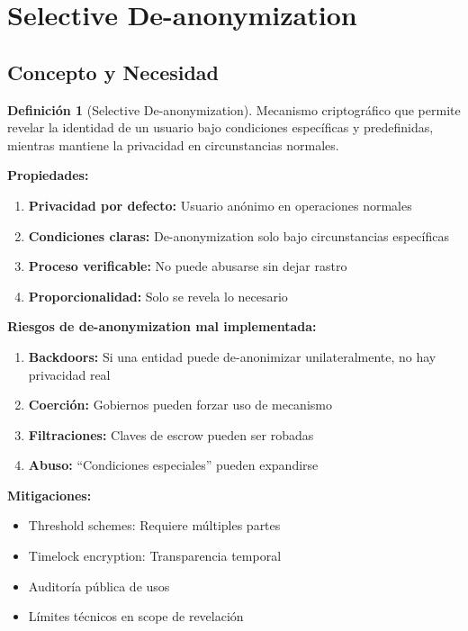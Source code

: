 \documentclass[11pt,a4paper,twoside]{book}
\theoremstyle{definition}
\newtheorem{definition}{Definición}[chapter]
\theoremstyle{remark}
\begin{document}
\section{Selective De-anonymization}
\label{sec:selective-deanon}

\subsection{Concepto y Necesidad}

\begin{definition}[Selective De-anonymization]
Mecanismo criptográfico que permite revelar la identidad de un usuario bajo condiciones específicas y predefinidas, mientras mantiene la privacidad en circunstancias normales.

\textbf{Propiedades:}
\begin{enumerate}
    \item \textbf{Privacidad por defecto:} Usuario anónimo en operaciones normales
    \item \textbf{Condiciones claras:} De-anonymization solo bajo circunstancias específicas
    \item \textbf{Proceso verificable:} No puede abusarse sin dejar rastro
    \item \textbf{Proporcionalidad:} Solo se revela lo necesario
\end{enumerate}
\end{definition}

\begin{advertencia}
\textbf{Riesgos de de-anonymization mal implementada:}

\begin{enumerate}
    \item \textbf{Backdoors:} Si una entidad puede de-anonimizar unilateralmente, no hay privacidad real
    \item \textbf{Coerción:} Gobiernos pueden forzar uso de mecanismo
    \item \textbf{Filtraciones:} Claves de escrow pueden ser robadas
    \item \textbf{Abuso:} ``Condiciones especiales'' pueden expandirse
\end{enumerate}

\textbf{Mitigaciones:}
\begin{itemize}
    \item Threshold schemes: Requiere múltiples partes
    \item Timelock encryption: Transparencia temporal
    \item Auditoría pública de usos
    \item Límites técnicos en scope de revelación
\end{itemize}
\end{advertencia}
\end{document}
